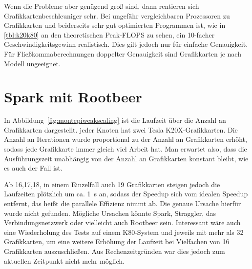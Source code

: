 Wenn die Probleme aber genügend groß sind, dann rentieren sich Grafikkartenbeschleuniger sehr.
Bei ungefähr vergleichbaren Prozessoren zu Grafikkarten und beiderseits sehr gut optimierten Programmen ist, wie in \autoref{tbl:k20k80} an den theoretischen Peak-FLOPS zu sehen, ein 10-facher Geschwindigkeitsgewinn realistisch.
Dies gilt jedoch nur für einfache Genauigkeit.
Für Fließkommaberechnungen doppelter Genauigkeit sind Grafikkarten je nach Modell ungeeignet.



\section{Spark mit Rootbeer}

In Abbildung~\ref{fig:montepiweakscaling} ist die Laufzeit über die Anzahl an Grafikkarten dargestellt. jeder Knoten hat zwei Tesla K20X-Grafikkarten.
Die Anzahl an Iterationen wurde proportional zu der Anzahl an Grafikkarten erhöht, sodass jede Grafikkarte immer gleich viel Arbeit hat.
Man erwartet also, dass die Ausführungszeit unabhängig von der Anzahl an Grafikkarten konstant bleibt, wie es auch der Fall ist.

Ab 16,17,18, in einem Einzelfall auch 19 Grafikkarten steigen jedoch die Laufzeiten plötzlich um ca. \SI{1}{\second} an, sodass der Speedup sich vom idealen Speedup entfernt, das heißt die parallele Effizienz nimmt ab.
Die genaue Ursache hierfür wurde nicht gefunden.
Mögliche Ursachen könnte Spark, Straggler, das Verbindungsnetzwerk oder vielleicht auch Rootbeer sein.
Interessant wäre auch eine Wiederholung des Tests auf einem K80-System und jeweils mit mehr als 32 Grafikkarten, um eine weitere Erhöhung der Laufzeit bei Vielfachen von 16 Grafikkarten auszuschließen.
Aus Rechenzeitgründen war dies jedoch zum aktuellen Zeitpunkt nicht mehr möglich.


